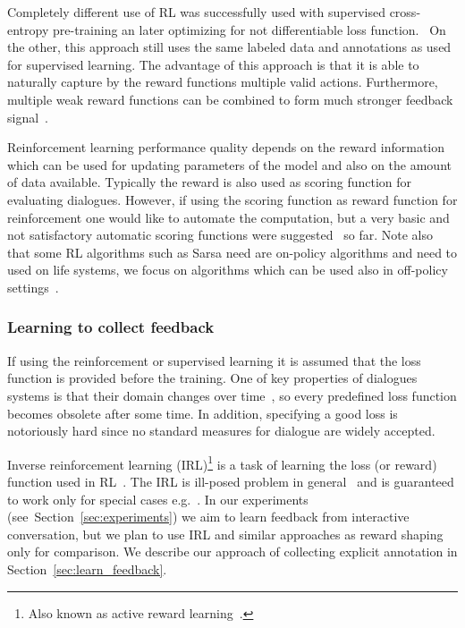 \documentclass[11pt]{article}
\begin{document}
Completely different use of RL was successfully used with supervised cross-entropy pre-training an later optimizing for not differentiable loss function.~\cite{williams2016end}
On the other, this approach still uses the same labeled data and annotations as used for supervised learning.
The advantage of this approach is that it is able to naturally capture by the reward functions multiple valid actions.
Furthermore, multiple weak reward functions can be combined to form much stronger feedback signal~\cite{abbeel_apprenticeship_2004}.

Reinforcement learning performance quality depends on the reward information which can be used for updating parameters of the model and also on the amount of data available.
Typically the reward is also used as scoring function for evaluating dialogues.
However, if using the scoring function as reward function for reinforcement one would like to automate the computation, but a very basic and not satisfactory automatic scoring functions were suggested~\cite{liu_how_2016,lowe_evaluation_2016} so far. 
Note also that some RL algorithms such as Sarsa need are on-policy algorithms and need to used on life systems, we focus on algorithms which can be used also in off-policy settings~\cite{sutton_reinforcement_1998}.

\subsubsection*{Learning to collect feedback}\label{sub:irl}
If using the reinforcement or supervised learning it is assumed that the loss function is provided before the training.
One of key properties of dialogues systems is that their domain changes over time~\cite{yu_evolvable_2016}, so every predefined loss function becomes obsolete after some time.
In addition, specifying a good loss is notoriously hard since no standard measures for dialogue are widely accepted.

Inverse reinforcement learning (IRL)\footnote{Also known as active reward learning~\cite{su2016active}.} is a task of learning the loss (or reward) function used in RL~\cite{abbeel_apprenticeship_2004}.
The IRL is ill-posed problem in general~\cite{choi_inverse_2011} and is guaranteed to work only for special cases e.g.~\cite{abbeel_apprenticeship_2004,choi_inverse_2011}.  
In our experiments (see~Section~\ref{sec:experiments}) we aim to learn feedback from interactive conversation, but we plan to use IRL and similar approaches as reward shaping~\cite{su2016active} only for comparison.
We describe our approach of collecting explicit annotation in Section~\ref{sec:learn_feedback}.
\end{document}
